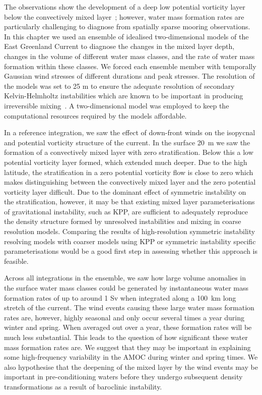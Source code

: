 The observations show the development of a deep low potential vorticity layer below the convectively mixed layer~\citep{LeBras2022}; however, water mass formation rates are particularly challenging to diagnose from spatially sparse mooring observations. In this chapter we used an ensemble of idealised two-dimensional models of the East Greenland Current to diagnose the changes in the mixed layer depth, changes in the volume of different water mass classes, and the rate of water mass formation within these classes. We forced each ensemble member with temporally Gaussian wind stresses of different durations and peak stresses. The resolution of the models was set to 25 m to ensure the adequate resolution of secondary Kelvin-Helmholtz instabilities which are known to be important in producing irreversible mixing~\citep{Yankovsky2019, Griffiths2003a}. A two-dimensional model was employed to keep the computational resources required by the models affordable\footnotemark.

In a reference integration, we saw the effect of down-front winds on the isopycnal and potential vorticity structure of the current. In the surface 20~m we saw the formation of a convectively mixed layer with zero stratification. Below this a low potential vorticity layer formed, which extended much deeper. Due to the high latitude, the stratification in a zero potential vorticity flow is close to zero which makes distinguishing between the convectively mixed layer and the zero potential vorticity layer difficult. Due to the dominant effect of symmetric instability on the stratification, however, it may be that existing mixed layer parameterisations of gravitational instability, such as KPP, are sufficient to adequately reproduce the density structure formed by unresolved instabilities and mixing in coarse resolution models. Comparing the results of high-resolution symmetric instability resolving models with coarser models using KPP or symmetric instability specific parameterisations would be a good first step in assessing whether this approach is feasible.

Across all integrations in the ensemble, we saw how large volume anomalies in the surface water mass classes could be generated by instantaneous water mass formation rates of up to around 1 Sv when integrated along a 100~km long stretch of the current. The wind events causing these large water mass formation rates are, however, highly seasonal and only occur several times a year during winter and spring. When averaged out over a year, these formation rates will be much less substantial. This leads to the question of how significant these water mass formation rates are. We suggest that they may be important in explaining some high-frequency variability in the AMOC during winter and spring times. We also hypothesise that the deepening of the mixed layer by the wind events may be important in pre-conditioning waters before they undergo subsequent density transformations as a result of baroclinic instability.

